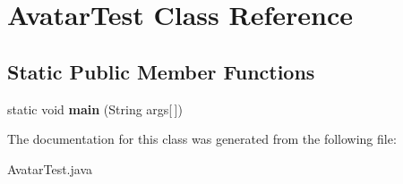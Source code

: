 \hypertarget{class_avatar_test}{}\section{Avatar\+Test Class Reference}
\label{class_avatar_test}
\subsection*{Static Public Member Functions}
\begin{DoxyCompactItemize}
\item 
\hypertarget{class_avatar_test_a43a1780e5c1895d7280134919d929372}{}static void {\bfseries main} (String args\mbox{[}$\,$\mbox{]})\label{class_avatar_test_a43a1780e5c1895d7280134919d929372}

\end{DoxyCompactItemize}


The documentation for this class was generated from the following file\+:\begin{DoxyCompactItemize}
\item 
Avatar\+Test.\+java\end{DoxyCompactItemize}
